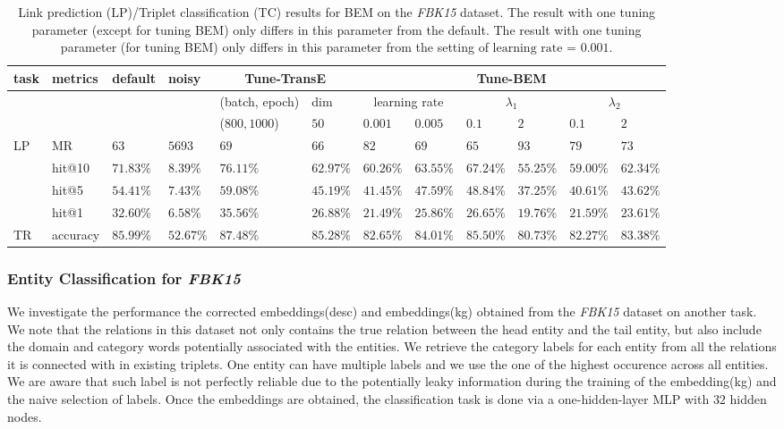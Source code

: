 \begin{table*}[h]
  \caption{Link prediction (LP)/Triplet classification (TC) results for BEM on the \textit{FBK15} dataset. The result with one tuning parameter (except for tuning BEM) only differs in this parameter from the default. The result with one tuning parameter (for tuning BEM) only differs in this parameter from the setting of $\text{learning rate = } 0.001$.}
  \label{tbl:tune_par_fbk15}
  \centering
\begin{tabular}{l|l|l|l|l|l|l|l|l|l|l|l}
\hline
  task        &metrics  & default & noisy  & \multicolumn{2}{c|}{Tune-TransE} &  \multicolumn{6}{c}{Tune-BEM} \\ \hline
         &  &  & & (batch, epoch) & dim & \multicolumn{2}{c|}{learning rate} & \multicolumn{2}{c|}{$\lambda_1$} & \multicolumn{2}{c}{$\lambda_2$} \\ \hline
            & & & & ($800, 1000$) & $50$ & $0.001$ & $0.005$ & $0.1$ & $2$ & $0.1$ & $2$ \\ \hline
  \multirow{4}{*}{LP} & MR & $63$ & $5693$ & $69$ & $66$ & $82$ & $69$ & $65$ & $93$ & $79$ & $73$  \\
             & hit@10& $71.83\%$ & $8.39\%$ & $76.11\%$ & $62.97\%$ & $60.26\%$ & $63.55\%$ & $67.24\%$ & $55.25\%$ & $59.00\%$ & $62.34\%$ \\
             & hit@5 & $54.41\%$ & $7.43\%$ & $59.08\%$ & $45.19\%$ & $41.45\%$ & $47.59\%$ & $48.84\%$ & $37.25\%$ & $40.61\%$ & $43.62\%$ \\
             & hit@1 & $32.60\%$ & $6.58\%$ & $35.56\%$ & $26.88\%$ & $21.49\%$ & $25.86\%$ & $26.65\%$ & $19.76\%$ & $21.59\%$ & $23.61\%$ \\\hline
  TR & accuracy & $85.99\%$ & $52.67\%$ & $87.48\%$ & $85.28\%$ & $82.65\%$ & $84.01\%$ & $85.50\%$ & $80.73\%$ & $82.27\%$ & $83.38\%$ \\\hline
  
\end{tabular}
\end{table*}


\subsubsection{Entity Classification for \textit{FBK15}}
We investigate the performance the corrected embeddings(desc) and embeddings(kg) obtained from the \textit{FBK15} dataset on another task. We note that the relations in this dataset not only contains the true relation between the head entity and the tail entity, but also include the domain and category words potentially associated with the entities. We retrieve the category labels for each entity from all the relations it is connected with in existing triplets. One entity can have multiple labels and we use the one of the highest occurence across all entities. We are aware that such label is not perfectly reliable due to the potentially leaky information during the training of the embedding(kg) and the naive selection of labels. Once the embeddings are obtained, the classification task is done via a one-hidden-layer MLP with $32$ hidden nodes.

